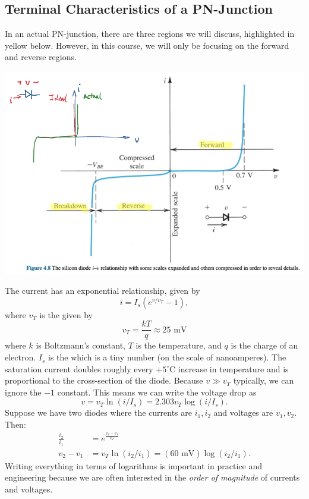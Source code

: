 \documentclass{article}
\numberwithin{equation}{section}
\begin{document}
\subsection{Terminal Characteristics of a PN-Junction}
In an actual PN-junction, there are three regions we will discuss, highlighted in yellow below. However, in this course, we will only be focusing on the forward and reverse regions.
\begin{center}
\includegraphics[width=0.9\linewidth]{silicon diode.png}
\end{center}
 The current has an exponential relationship, given by
\begin{equation}
    i = I_s\left(e^{v/v_T} - 1\right),
\end{equation}
where $v_T$ is the  given by
\begin{equation}
    v_T = \frac{kT}{q} \approx 25\text{ mV}
\end{equation}
where $k$ is Boltzmann's constant, $T$ is the temperature, and $q$ is the charge of an electron. $I_s$ is the  which is a tiny number (on the scale of nanoamperes). The saturation current doubles roughly every $+5^\circ \text{C}$ increase in temperature and is proportional to the cross-section of the diode. Because $v \gg v_T$ typically, we can ignore the $-1$ constant. This means we can write the voltage drop as
\begin{equation*}
    v = v_T\ln(i/I_s) = 2.303v_T\log(i/I_s).
\end{equation*}
Suppose we have two diodes where the currents are $i_1,i_2$ and voltages are $v_1,v_2.$ Then:
\begin{align*}
    \frac{i_2}{i_1} &= e^{\frac{v_2-v_1}{v_T}} \\ 
    v_2 - v_1 &= v_T\ln\left(i_2/i_1\right)  = (60\text{ mV})\log(i_2/i_1).
\end{align*}
Writing everything in terms of logarithms is important in practice and engineering because we are often  interested in the \textit{order of magnitude} of currents and voltages.
\end{document}
